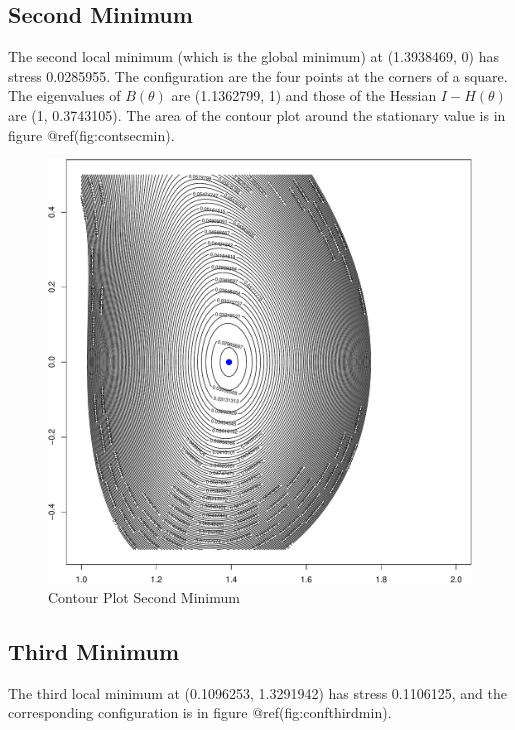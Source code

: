 \documentclass[
  12pt,
  letterpaper,
  DIV=11,
  numbers=noendperiod]{scrreprt}
\theoremstyle{remark}
\begin{document}
\subsection{Second Minimum}\label{second-minimum}

The second local minimum (which is the global minimum) at (1.3938469, 0)
has stress 0.0285955. The configuration are the four points at the
corners of a square. The eigenvalues of \(B(\theta)\) are (1.1362799, 1)
and those of the Hessian \(I-H(\theta)\) are (1, 0.3743105). The area of
the contour plot around the stationary value is in figure
@ref(fig:contsecmin).

\begin{figure}[H]

{\centering \includegraphics{spaces_files/figure-pdf/contsecmin-1.pdf}

}

\caption{Contour Plot Second Minimum}

\end{figure}%

\subsection{Third Minimum}\label{third-minimum}

The third local minimum at (0.1096253, 1.3291942) has stress 0.1106125,
and the corresponding configuration is in figure @ref(fig:confthirdmin).
\end{document}
